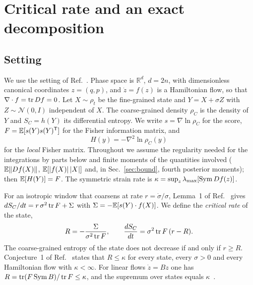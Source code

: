 \section{Critical rate and an exact decomposition}
\label{sec:decomposition}

\subsection{Setting}
We use the setting of Ref.~\cite{namba2026arrow}. Phase space is $\mathbb R^d$, $d = 2n$, with dimensionless canonical coordinates $z = (q,p)$, and $\dot z = f(z)$ is a Hamiltonian flow, so that $\nabla\cdot f = \operatorname{tr} Df = 0$. Let $X \sim \rho_t$ be the fine-grained state and $Y = X + \sigma Z$ with $Z \sim \mathcal N(0,I)$ independent of $X$. The coarse-grained density $\rho_C$ is the density of $Y$ and $S_C = h(Y)$ its differential entropy. We write $s = \nabla\ln\rho_C$ for the score, $F = \mathbb{E}[s(Y)s(Y)^{\mathsf T}]$ for the Fisher information matrix, and
\begin{equation}
H(y) = -\nabla^2\ln\rho_C(y)
\label{eq:H}
\end{equation}
for the \emph{local} Fisher matrix. Throughout we assume the regularity needed for the integrations by parts below and finite moments of the quantities involved ($\mathbb{E}\|Df(X)\|$, $\mathbb{E}[|f(X)|\,|X|]$ and, in Sec.~\ref{sec:bound}, fourth posterior moments); then $\mathbb{E}[H(Y)] = F$. The symmetric strain rate is $\kappa = \sup_z\lambda_{\max}[\operatorname{Sym} Df(z)]$.

For an isotropic window that coarsens at rate $r = \dot\sigma/\sigma$, Lemma~1 of Ref.~\cite{namba2026arrow} gives $dS_C/dt = r\,\sigma^2\operatorname{tr} F + \Sigma$ with $\Sigma = -\mathbb{E}[s(Y)\cdot f(X)]$. We define the \emph{critical rate} of the state,
\begin{equation}
R = -\frac{\Sigma}{\sigma^2\operatorname{tr} F}, \qquad \frac{dS_C}{dt} = \sigma^2\operatorname{tr} F\,(r - R).
\label{eq:R}
\end{equation}
The coarse-grained entropy of the state does not decrease if and only if $r \geq R$. Conjecture~1 of Ref.~\cite{namba2026arrow} states that $R \leq \kappa$ for every state, every $\sigma > 0$ and every Hamiltonian flow with $\kappa < \infty$. For linear flows $\dot z = Bz$ one has $R = \operatorname{tr}(F\operatorname{Sym} B)/\operatorname{tr} F \leq \kappa$, and the supremum over states equals $\kappa$~\cite{namba2026arrow}.

